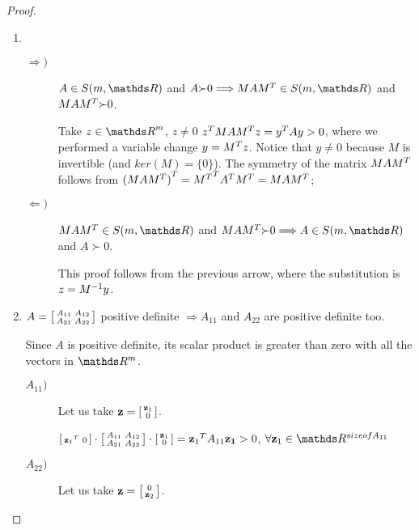 \documentclass[ComputationalMathematics.tex]{subfiles}
\begin{document}
\begin{proof}~\\
   \begin{enumerate}
    \item~\\
      \begin{description}
        \item[$\Rightarrow)$]
          $A \in S(m, \R)$ and $A {\succ} 0  \Longrightarrow MA\tr{M} \in S(m, \R)$ and $MA{M}^{T} {\succ} 0$.

          Take $z \in {\R}^m$, $z\neq 0$ ${z}^{T} MA{M}^{T} z = {y}^{T} Ay > 0$, where we performed a variable change $y = {M}^{T} z$. Notice that $y \neq 0$ because $M$ is invertible (and $ker(M) = \{ 0 \}$). The symmetry of the matrix $MA{M}^{T}$ follows from ${(MA{M}^{T})}^{T} = {{M}^{T}}^{T} {A}^{T} {M}^{T} = MA{M}^{T}$;
        \item[$\Leftarrow)$]
          $MA\tr{M} \in S(m, \R)$ and $MA\tr{M} {\succ} 0  \Longrightarrow A \in S(m, \R)$ and $A {\succ} 0$.
          
          This proof follows from the previous arrow, where the substitution is $z = {M}^{-1}y$.
            \end{description}
     \item $A = \begin{bsmallmatrix}
	    A_{11} & A_{12}\\
	    A_{21} & A_{22}
     \end{bsmallmatrix}$ positive definite $\Longrightarrow A_{11}$ and $A_{22}$ are positive definite too.

      Since $A$ is positive definite, its scalar product is greater than zero with all the vectors in $\R^m$. 
  \begin{description}
    \item[$A_{11})$]
      Let us take $\mathbf{z}=
        \begin{bsmallmatrix}
          \mathbf{z}_1\\0
        \end{bsmallmatrix}$.

        $\begin{bsmallmatrix}
          {\mathbf{z}_1}^{T} &0\\
        \end{bsmallmatrix} 
        \cdot 
        \begin{bsmallmatrix}
	        A_{11} & A_{12}\\
	        A_{21} & A_{22}
        \end{bsmallmatrix}
        \cdot 
        \begin{bsmallmatrix}
          \mathbf{z}_1\\0
        \end{bsmallmatrix}
        = {\mathbf{z}_1}^{T} A_{11} \mathbf{z_1} > 0$, $\forall \mathbf{z}_1 \in \R^{size of A_{11}}$
      \item[$A_{22})$]
      Let us take $\mathbf{z}=
      \begin{bsmallmatrix}
        0\\\mathbf{z}_2
      \end{bsmallmatrix}$.


\end{description}
\end{enumerate}
\end{proof}
\end{document}
